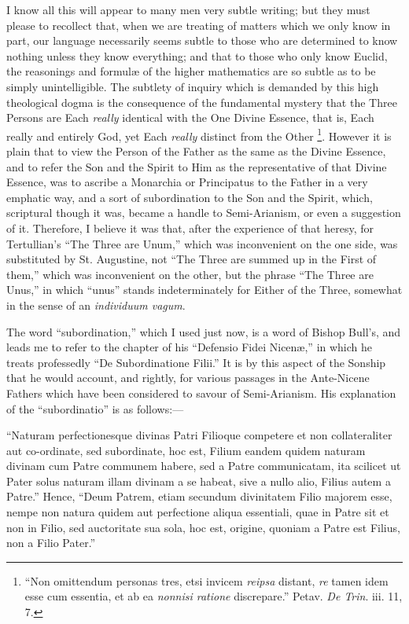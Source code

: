 I know all this will appear to many men very subtle writing; but
they must please to recollect that, when we are treating of matters
which we only know in part, our language necessarily seems subtle to
those who are determined to know nothing unless they know everything;
and that to those who only know Euclid, the reasonings and
formulæ of the higher mathematics are so subtle as to be simply
unintelligible. The subtlety of inquiry which is demanded by this high
theological dogma is the consequence of the fundamental mystery that
the Three Persons are Each \emph{really} identical with the One Divine
Essence, that is, Each really and entirely God, yet Each \emph{really}
distinct from the Other \footnote{``Non
omittendum personas tres, etsi invicem \emph{reipsa} distant, \emph{re}
tamen idem esse cum essentia, et ab ea \emph{nonnisi ratione}
discrepare.'' Petav. \emph{De Trin}. iii. 11, 7.}.
However it is plain that to view the Person of the Father as the same
as the Divine Essence, and to refer the Son and the Spirit to Him as
the representative of that Divine Essence, was to ascribe a Monarchia
or Principatus to the Father in a very emphatic way, and a sort of
subordination to the Son and the Spirit, which, scriptural though it
was, became a handle to Semi-Arianism, or even a suggestion of it.
Therefore, I believe it was that, after the experience of that heresy,
for Tertullian's ``The Three are Unum,'' which was
inconvenient on the one side, was substituted by St. Augustine, not
``The Three are summed up in the First of them,'' which was
inconvenient on the other, but the phrase ``The Three are Unus,''
in which ``unus'' stands indeterminately for Either of the
Three, somewhat in the sense of an \emph{individuum vagum}.

The word ``subordination,'' which I used just now, is a
word of Bishop Bull's, and leads me to refer to the chapter of his
``Defensio Fidei Nicenæ,'' in which he treats professedly
``De Subordinatione Filii.'' It is by this aspect of the
Sonship that he would account, and rightly, for various passages
in the Ante-Nicene Fathers which have been considered to savour of
Semi-Arianism. His explanation of the ``subordinatio'' is as
follows:—

``Naturam perfectionesque divinas Patri Filioque competere et
non collateraliter aut co-ordinate, sed subordinate, hoc est, Filium
eandem quidem naturam divinam cum Patre communem habere, sed a Patre
communicatam, ita scilicet ut Pater solus naturam illam divinam a se
habeat, sive a nullo alio, Filius autem a Patre.'' Hence,
``Deum Patrem, etiam secundum divinitatem Filio majorem esse,
nempe non natura quidem aut perfectione aliqua essentiali, quae in
Patre sit et non in Filio, sed auctoritate sua sola, hoc est, origine,
quoniam a Patre est Filius, non a Filio Pater.''

